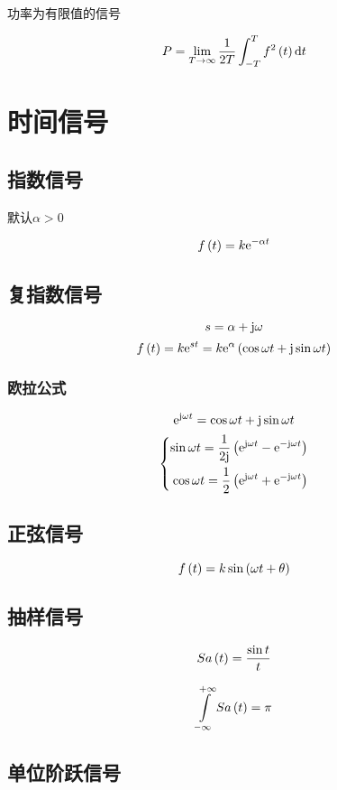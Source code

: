 \documentclass{article}
\begin{document}
功率为有限值的信号

\[P=\lim_{T\to\infty}\frac1{2T}\int_{-T}^Tf^2\left(t\right)\mathrm d t\]

\section{时间信号}

\subsection{指数信号}

默认$\alpha>0$

\[f\left(t\right)=k\mathrm e^{-\alpha t}\]

\subsection{复指数信号}

\[s=\alpha+\mathrm j\omega\]
\[f\left(t\right)=k\mathrm e^{st}=k\mathrm e^\alpha\left(\cos\omega t+\mathrm j\sin\omega t\right)\]

\subsubsection{欧拉公式}

\[\mathrm e^{\mathrm j\omega t}=\cos\omega t+\mathrm j\sin\omega t\]
\[\left\{\begin{aligned}
        \sin\omega t=\frac1{2\mathrm j}\left(\mathrm e^{\mathrm j\omega t}-\mathrm e^{-\mathrm j\omega t}\right) \\
        \cos\omega t=\frac12\left(\mathrm e^{\mathrm j\omega t}+\mathrm e^{-\mathrm j\omega t}\right)     \\
    \end{aligned}\right.\]

\subsection{正弦信号}

\[f\left(t\right)=k\sin\left(\omega t+\theta\right)\]

\subsection{抽样信号}

\[Sa\left(t\right)=\frac{\sin t}t\]

\[\impint Sa\pare{t}=\pi\]

\subsection{单位阶跃信号}
\end{document}
